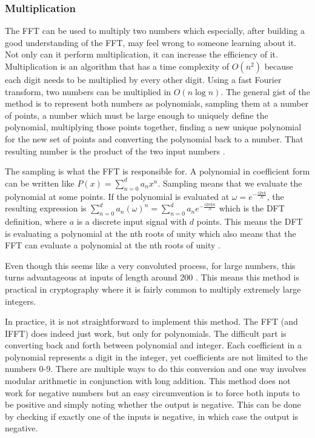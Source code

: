 \subsubsection{Multiplication}
The FFT can be used to multiply two numbers which especially, after building a good understanding of the FFT, may feel wrong to someone learning about it. Not only can it perform multiplication, it can increase the efficiency of it. Multiplication is an algorithm that has a time complexity of $O(n^2)$ because each digit needs to be multiplied by every other digit. Using a fast Fourier transform, two numbers can be multiplied in $O(n \log n)$. The general gist of the method is to represent both numbers as polynomials, sampling them at a number of points, a number which must be large enough to uniquely define the polynomial, multiplying those points together, finding a new unique polynomial for the new set of points and converting the polynomial back to a number. That resulting number is the product of the two input numbers \cite{Reducible2020}. 

The sampling is what the FFT is responsible for. A polynomial in coefficient form can be written like $P(x) = \sum^d_{n=0} a_nx^n$. Sampling means that we evaluate the polynomial at some points. If the polynomial is evaluated at $\omega = e^{-\frac{i2\pi k}{N}}$, the resulting expression is $\sum^d_{n=0} a_n(\omega)^n = \sum^d_{n=0} a_ne^{-\frac{i2\pi k n}{N}}$ which is the DFT definition, where $a$ is a discrete input signal with $d$ points. This means the DFT is evaluating a polynomial at the nth roots of unity which also means that the FFT can evaluate a polynomial at the nth roots of unity \cite{Emerencia2007}.

Even though this seems like a very convoluted process, for large numbers, this turns advantageous at inputs of length around 200 \cite{Emerencia2007}. This means this method is practical in cryptography where it is fairly common to multiply extremely large integers. 

In practice, it is not straightforward to implement this method. The FFT (and IFFT) does indeed just work, but only for polynomials. The difficult part is converting back and forth between polynomial and integer. Each coefficient in a polynomial represents a digit in the integer, yet coefficients are not limited to the numbers 0-9. There are multiple ways to do this conversion and one way involves modular arithmetic in conjunction with long addition. This method does not work for negative numbers but an easy circumvention is to force both inputs to be positive and simply noting whether the output is negative. This can be done by checking if exactly one of the inputs is negative, in which case the output is negative.





